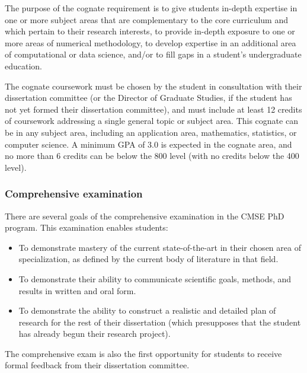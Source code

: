 The purpose of the cognate requirement is to give students in-depth
expertise in one or more subject areas that are complementary to the
core curriculum and which pertain to their research interests, to
provide in-depth exposure to one or more areas of numerical
methodology, to develop expertise in an additional area of
computational or data science, and/or to fill gaps in a student's
undergraduate education.

The cognate coursework must be chosen by the student in consultation
with their dissertation committee (or the Director of Graduate
Studies, if the student has not yet formed their dissertation
committee), and must include at least 12 credits of 
coursework addressing a single general topic or subject area.  This
cognate can be in any subject area, including an application area,
mathematics, statistics, or computer science.  A minimum GPA of 3.0 is
expected in the cognate area, and no more than 6 credits can be below
the 800 level (with no credits below the 400 level).

\vspace{3mm}
\subsubsection{Comprehensive examination}
\label{sec:comp_exam}

There are several goals of the comprehensive examination in the CMSE
PhD program.  This examination enables students:

\begin{itemize}
\item To demonstrate mastery of the current state-of-the-art in their
  chosen area of specialization, as defined by the current body of
  literature in that field.

\item To demonstrate their ability to communicate scientific goals,
  methods, and results in written and oral form. 

\item To demonstrate the ability to construct a realistic and detailed
  plan of research for the rest of their dissertation (which
  presupposes that the student has already begun their research project).

\end{itemize}

The comprehensive exam is also the first opportunity for students to
receive formal feedback from their dissertation committee.

